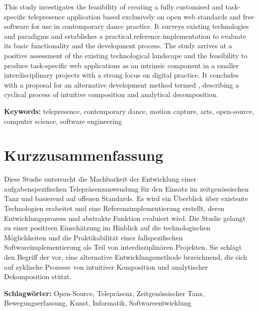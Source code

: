 
This study investigates the feasibility of creating a fully customised and task-specific telepresence application based exclusively on open web standards and free software for use in contemporary dance practice.
It surveys existing technologies and paradigms and establishes a practical reference implementation to evaluate its basic functionality and the development process.
The study arrives at a positive assessment of the existing technological landscape and the feasibility to produce task-specific web applications as an intrinsic component in a smaller interdisciplinary projects with a strong focus on digital practice.
It concludes with a proposal for an alternative development method termed , describing a cyclical process of intuitive composition and analytical decomposition.

\textbf{Keywords:} telepresence, contemporary dance, motion capture, arts, open-source, computer science, software engineering


\section*{Kurzzusammenfassung}

Diese Studie untersucht die Machbarkeit der Entwicklung einer aufgabenspezifischen Telepräsenzanwendung für den Einsatz im zeitgenössischen Tanz und basierend auf offenen Standards.
Es wird ein Überblick über existente Technologien erabeitet und eine Referenzimplementierung erstellt, deren Entwicklungsprozess und abstrakte Funktion evaluiert wird.
Die Studie gelangt zu einer positiven Einschätzung im Hinblick auf die technologischen Möglichkeiten und die Praktikabilität einer fallspezifischen Softwareimplementierung als Teil von interdisziplinären Projekten.
Sie schlägt den Begriff der  vor, eine alternative Entwicklungsmethode bezeichnend, die sich auf zyklische Prozesse von intuitiver Komposition und analytischer Dekomposition stützt.
 
 \textbf{Schlagwörter:} Open-Source, Telepräsenz, Zeitgenössischer Tanz, Bewegungserfassung, Kunst, Informatik, Softwareentwicklung
 